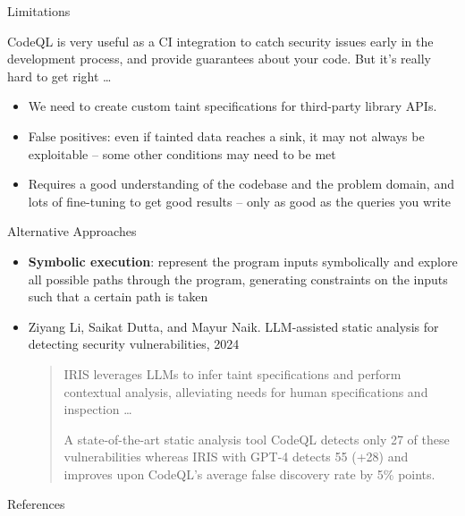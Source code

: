 \documentclass[aspectratio=169,xcolor=dvipsnames]{beamer}
\begin{document}
\begin{frame}{Limitations}

	CodeQL is very useful as a CI integration to catch security issues early in the
	development process, and provide guarantees about your code. But it's really
	hard to get right \dots

	\bigskip

	\begin{itemize}
		\item We need to create custom taint specifications for third-party library APIs.
		\item False positives: even if tainted data reaches a sink, it may not always be
		      exploitable -- some other conditions may need to be met
		\item Requires a good understanding of the codebase and the problem domain, and lots
		      of fine-tuning to get good results -- only as good as the queries you write
	\end{itemize}
\end{frame}

\begin{frame}{Alternative Approaches}

	\begin{itemize}
		\item {\bf Symbolic execution}: represent the program inputs symbolically and explore all
		      possible paths through the program, generating constraints on the inputs such
		      that a certain path is taken
		\item Ziyang Li, Saikat Dutta, and Mayur Naik. LLM-assisted static analysis for
		      detecting security vulnerabilities, 2024 \bigskip

		      \begin{quote}
			      IRIS leverages LLMs to infer taint specifications and perform contextual analysis, alleviating needs for human specifications and inspection \dots

			      A state-of-the-art static analysis tool CodeQL detects only 27 of these
			      vulnerabilities whereas IRIS with GPT-4 detects 55 (+28) and improves upon
			      CodeQL's average false discovery rate by 5\% points.
		      \end{quote}
	\end{itemize}
\end{frame}


\begin{frame}{References}
	\nocite{*}
	
\end{frame}
\end{document}
